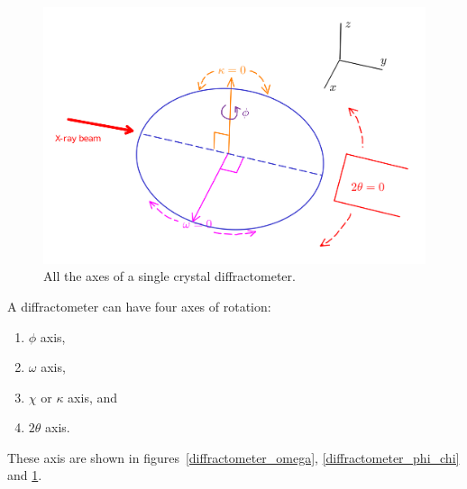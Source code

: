 \begin{figure}
	\centering
	\includegraphics[scale=0.15]{all_axes.png}
	\caption{\label{diffractometer_all_axes}All the axes of a single crystal diffractometer.}
\end{figure}
 
A diffractometer can have four axes of rotation:%
%	
	\begin{enumerate}%
%	
	    \item $\phi$ axis,
	    
	    \item $\omega$ axis,
	    
	    \item $\chi$ or $\kappa$ axis, and
	    
	    \item $2\theta$ axis.
	    
	\end{enumerate}

These axis are shown in figures~\ref{diffractometer_omega}, \ref{diffractometer_phi_chi} and \ref{diffractometer_all_axes}.\\

